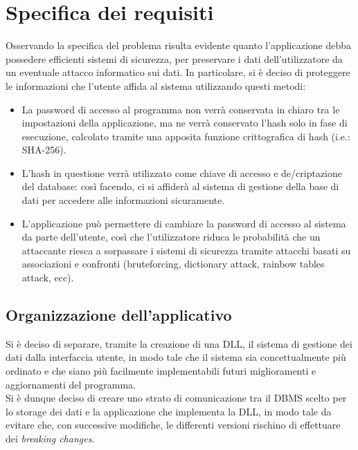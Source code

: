 \documentclass[a4paper,10pt]{report}
\begin{document}
\chapter{Specifica dei requisiti}
	Osservando la specifica del problema risulta evidente quanto l’applicazione
		debba possedere efficienti sistemi di sicurezza, per preservare i dati
		dell’utilizzatore da un eventuale attacco informatico sui dati.\vfill
		In particolare, si è deciso di proteggere le informazioni che l’utente affida
		al sistema utilizzando questi metodi:\vfill
		\begin{itemize}
				\item La password di accesso al programma non verrà conservata in chiaro
					tra le impostazioni della applicazione, ma ne verrà conservato l'hash
					solo in fase di esecuzione,	calcolato tramite una apposita funzione
					crittografica di hash (i.e.: SHA-256).
				\item L'hash in questione verrà utilizzato come chiave di accesso e
					de/criptazione del database: così facendo, ci si affiderà al sistema
					di gestione della base di dati per accedere alle informazioni sicuramente.
				\item	L’applicazione può permettere di cambiare la password di accesso
					al sistema da parte dell’utente, così che l’utilizzatore riduca le
					probabilità che un attaccante riesca a sorpassare i	sistemi di
					sicurezza tramite attacchi basati su associazioni e confronti
					(bruteforcing, dictionary attack, rainbow tables attack, ecc).
			\end{itemize}
  \section{Organizzazione dell'applicativo}
    Si è deciso di separare, tramite la creazione di una DLL, il sistema di
			gestione dei dati dalla interfaccia utente, in modo tale che il sistema
			sia concettualmente più ordinato e che siano più facilmente implementabili
			futuri miglioramenti e aggiornamenti del programma.\\
			Si è dunque deciso di creare uno strato di comunicazione tra il DBMS
			scelto per lo storage dei dati e la applicazione che implementa la DLL,
			in modo tale da evitare che, con successive modifiche, le differenti
			versioni rischino di effettuare dei {\itshape breaking changes}.
\end{document}
